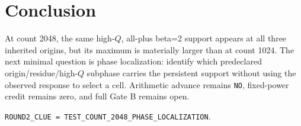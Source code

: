 \documentclass[10pt]{article}
\begin{document}
\section{Conclusion}

At count 2048, the same high-$Q$, all-plus beta=2 support appears at all three
inherited origins, but its maximum is materially larger than at count 1024.
The next minimal question is phase localization: identify which predeclared
origin/residue/high-$Q$ subphase carries the persistent support without using
the observed response to select a cell. Arithmetic advance remains
\texttt{NO}, fixed-power credit remains zero, and full Gate B remains open.

\begin{center}\small
\texttt{ROUND2\_CLUE = TEST\_COUNT\_2048\_PHASE\_LOCALIZATION}.
\end{center}
\end{document}
